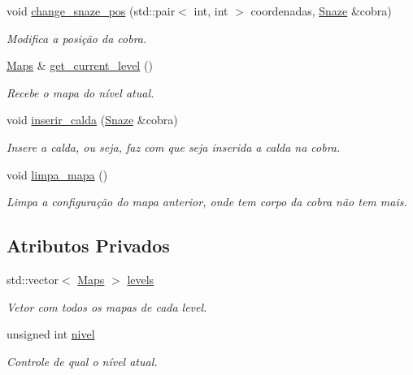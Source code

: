\begin{DoxyCompactItemize}
void \hyperlink{classLevel_ac42ca0b4e7c6c493ddaa00ed06fb2e3f}{change\+\_\+snaze\+\_\+pos} (std\+::pair$<$ int, int $>$ coordenadas, \hyperlink{classSnaze}{Snaze} \&cobra)
\begin{DoxyCompactList}\small\item\em Modifica a posição da cobra. \end{DoxyCompactList}\item 
\hyperlink{classMaps}{Maps} \& \hyperlink{classLevel_a1687e136ca75db79f5b3ac51a6f3c268}{get\+\_\+current\+\_\+level} ()
\begin{DoxyCompactList}\small\item\em Recebe o mapa do nível atual. \end{DoxyCompactList}\item 
void \hyperlink{classLevel_a00b118e009a3c8e8b4f33de9493e3a6a}{inserir\+\_\+calda} (\hyperlink{classSnaze}{Snaze} \&cobra)
\begin{DoxyCompactList}\small\item\em Insere a calda, ou seja, faz com que seja inserida a calda na cobra. \end{DoxyCompactList}\item 
void \hyperlink{classLevel_a4f17b96d65d88f2c0764417c6acb435c}{limpa\+\_\+mapa} ()
\begin{DoxyCompactList}\small\item\em Limpa a configuração do mapa anterior, onde tem corpo da cobra não tem mais. \end{DoxyCompactList}\end{DoxyCompactItemize}
\subsection*{Atributos Privados}
\begin{DoxyCompactItemize}
\item 
std\+::vector$<$ \hyperlink{classMaps}{Maps} $>$ \hyperlink{classLevel_a8b1c3287f0f55ae114562e9aaa0914c4}{levels}
\begin{DoxyCompactList}\small\item\em Vetor com todos os mapas de cada level. \end{DoxyCompactList}\item 
unsigned int \hyperlink{classLevel_af40fbdea10408d1ae09698d49e072aa6}{nivel}
\begin{DoxyCompactList}\small\item\em Controle de qual o nível atual. \end{DoxyCompactList}\end{DoxyCompactItemize}


